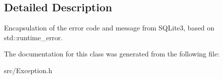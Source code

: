 \subsection{Detailed Description}
Encapsulation of the error code and message from S\-Q\-Lite3, based on std\-::runtime\-\_\-error. 



The documentation for this class was generated from the following file\-:\begin{DoxyCompactItemize}
\item 
src/Exception.\-h\end{DoxyCompactItemize}
